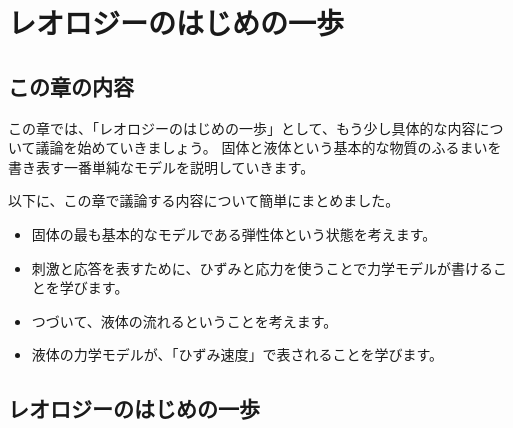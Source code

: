 \documentclass[uplatex,dvipdfmx,a4paper,11pt]{jsreport}
\begin{document}
\setcounter{chapter}{2}
\chapter{レオロジーのはじめの一歩}

\section*{この章の内容}

この章では、「レオロジーのはじめの一歩」として、もう少し具体的な内容について議論を始めていきましょう。
固体と液体という基本的な物質のふるまいを書き表す一番単純なモデルを説明していきます。

以下に、この章で議論する内容について簡単にまとめました。
	\begin{boxnote}
		\large
		\begin{itemize}
			\item 固体の最も基本的なモデルである弾性体という状態を考えます。
			\item 刺激と応答を表すために、ひずみと応力を使うことで力学モデルが書けることを学びます。
			\item つづいて、液体の流れるということを考えます。
			\item 液体の力学モデルが、「ひずみ速度」で表されることを学びます。
		\end{itemize} 
	\end{boxnote}

\section{レオロジーのはじめの⼀歩}
\end{document}
